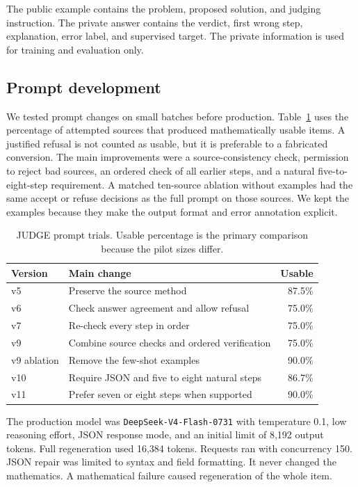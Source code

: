 \documentclass[11pt]{article}
\begin{document}
The public example contains the problem, proposed solution, and judging instruction. The private answer contains the verdict, first wrong step, explanation, error label, and supervised target. The private information is used for training and evaluation only.

\subsection{Prompt development}

We tested prompt changes on small batches before production. Table~\ref{tab:prompt-dev} uses the percentage of attempted sources that produced mathematically usable items. A justified refusal is not counted as usable, but it is preferable to a fabricated conversion. The main improvements were a source-consistency check, permission to reject bad sources, an ordered check of all earlier steps, and a natural five-to-eight-step requirement. A matched ten-source ablation without examples had the same accept or refuse decisions as the full prompt on those sources. We kept the examples because they make the output format and error annotation explicit.

\begin{table}[t]
\centering
\footnotesize
\setlength{\tabcolsep}{3pt}
\begin{tabular}{lp{}r}
\toprule
Version & Main change & Usable \\
\midrule
v5 & Preserve the source method & 87.5\% \\
v6 & Check answer agreement and allow refusal & 75.0\% \\
v7 & Re-check every step in order & 75.0\% \\
v9 & Combine source checks and ordered verification & 75.0\% \\
v9 ablation & Remove the few-shot examples & 90.0\% \\
v10 & Require JSON and five to eight natural steps & 86.7\% \\
v11 & Prefer seven or eight steps when supported & 90.0\% \\
\bottomrule
\end{tabular}
\caption{JUDGE prompt trials. Usable percentage is the primary comparison because the pilot sizes differ.}
\label{tab:prompt-dev}
\end{table}

The production model was \texttt{DeepSeek-V4-Flash-0731} with temperature 0.1, low reasoning effort, JSON response mode, and an initial limit of 8,192 output tokens. Full regeneration used 16,384 tokens. Requests ran with concurrency 150. JSON repair was limited to syntax and field formatting. It never changed the mathematics. A mathematical failure caused regeneration of the whole item.
\end{document}
